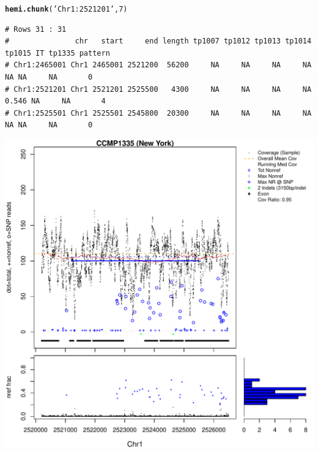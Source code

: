 \documentclass{article}\usepackage[]{graphicx}\usepackage[]{color}
\makeatletter
\def\maxwidth{ %
  \ifdim\Gin@nat@width>\linewidth
    \linewidth
  \else
    \Gin@nat@width
  \fi
}
\newcommand{\hlnum}[1]{\textcolor[rgb]{0.686,0.059,0.569}{#1}}%
\newcommand{\hlstr}[1]{\textcolor[rgb]{0.192,0.494,0.8}{#1}}%
\newcommand{\hlstd}[1]{\textcolor[rgb]{0.345,0.345,0.345}{#1}}%
\newcommand{\hlkwd}[1]{\textcolor[rgb]{0.737,0.353,0.396}{\textbf{#1}}}%
\newenvironment{kframe}{%
 \def\at@end@of@kframe{}%
 \ifinner\ifhmode%
  \def\at@end@of@kframe{\end{minipage}}%
  \begin{minipage}{\columnwidth}%
 \fi\fi%
 \def\FrameCommand##1{\hskip\@totalleftmargin \hskip-\fboxsep
 \colorbox{shadecolor}{##1}\hskip-\fboxsep
     \hskip-\linewidth \hskip-\@totalleftmargin \hskip\columnwidth}%
 \MakeFramed {\advance\hsize-\width
   \@totalleftmargin\z@ \linewidth\hsize
   \@setminipage}}%
 {\par\unskip\endMakeFramed%
 \at@end@of@kframe}
\newenvironment{knitrout}{}{} %
\makeatother
\begin{document}
\begin{knitrout}\footnotesize
{}\color{fgcolor}\begin{kframe}
\begin{alltt}
\hlkwd{hemi.chunk}\hlstd{(}\hlstr{'Chr1:2521201'}\hlstd{,}\hlnum{7}\hlstd{)}
\end{alltt}
\begin{verbatim}
# Rows 31 : 31 
#               chr   start     end length tp1007 tp1012 tp1013 tp1014 tp1015 IT tp1335 pattern
# Chr1:2465001 Chr1 2465001 2521200  56200     NA     NA     NA     NA     NA NA     NA       0
# Chr1:2521201 Chr1 2521201 2525500   4300     NA     NA     NA     NA  0.546 NA     NA       4
# Chr1:2525501 Chr1 2525501 2545800  20300     NA     NA     NA     NA     NA NA     NA       0
\end{verbatim}
\end{kframe}

{\centering \includegraphics[width=\maxwidth]{figs-knitr/unnamed-chunk-48-1} 

}



\end{knitrout}
\end{document}
